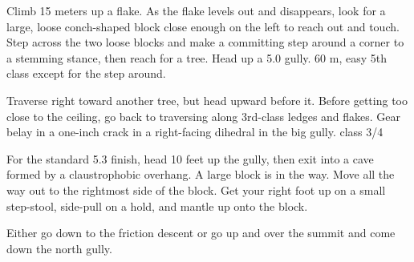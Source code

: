 \documentclass{tahquitz}
\begin{document}
 Climb 15 meters up a flake. As the flake levels out and
disappears, look for a large, loose conch-shaped block close enough
on the left to reach out and touch. Step across the two loose blocks and
make a committing step around a corner to a stemming stance, then
reach for a tree. Head up a 5.0 gully. 60 m, easy 5th class except for
the step around.

 Traverse right toward another tree, but head upward before
it.  Before getting too close to the ceiling, go back to traversing
along 3rd-class ledges and flakes.  Gear belay in a one-inch
crack in a right-facing dihedral in the big gully. class 3/4

 For the standard 5.3 finish, head 10 feet up the gully,
then exit into a cave formed by a claustrophobic overhang. 
A large block is in the way.
Move all the way out to the rightmost side of
the block. Get your right foot up on a small step-stool,
side-pull on a hold, and mantle up onto the block.

Either go down to the friction descent or go up and over the summit
and come down the north gully.

\myfooter\vfill %
\end{document}
